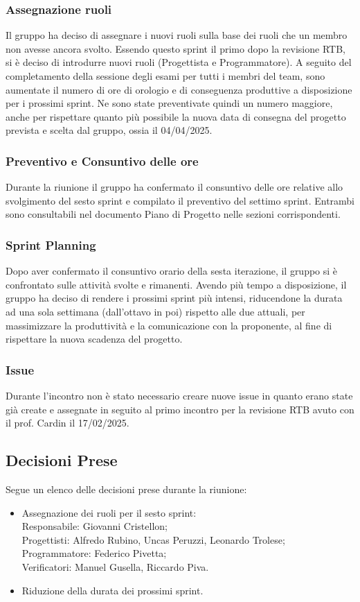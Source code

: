 \documentclass[10pt]{article}
\begin{document}
\subsubsection{Assegnazione ruoli}
Il gruppo ha deciso di assegnare i nuovi ruoli sulla base dei ruoli che un membro non avesse ancora svolto. Essendo questo sprint il primo dopo la revisione RTB, si è deciso di introdurre nuovi ruoli (Progettista e Programmatore). A seguito del completamento della sessione degli esami per tutti i membri del team, sono aumentate il numero di ore di orologio e di conseguenza produttive a disposizione per i prossimi sprint. Ne sono state preventivate quindi un numero maggiore, anche per rispettare quanto più possibile la nuova data di consegna del progetto prevista e scelta dal gruppo, ossia il 04/04/2025.

\subsubsection{Preventivo e Consuntivo delle ore}
Durante la riunione il gruppo ha confermato il consuntivo delle ore relative allo svolgimento del sesto sprint e compilato il preventivo del settimo sprint.
Entrambi sono consultabili nel documento Piano di Progetto nelle sezioni corrispondenti.

\subsubsection{Sprint Planning}
Dopo aver confermato il consuntivo orario della sesta iterazione, il gruppo si è confrontato sulle attività svolte e rimanenti. Avendo più tempo a disposizione, il gruppo ha deciso di rendere i prossimi sprint più intensi, riducendone la durata ad una sola settimana (dall'ottavo in poi) rispetto alle due attuali, per massimizzare la produttività e la comunicazione con la proponente, al fine di rispettare la nuova scadenza del progetto.

\subsubsection{Issue}
Durante l'incontro non è stato necessario creare nuove issue in quanto erano state già create e assegnate in seguito al primo incontro per la revisione RTB avuto con il prof. Cardin il 17/02/2025.

\subsection{Decisioni Prese}
Segue un elenco delle decisioni prese durante la riunione:
\begin{itemize}
    \item   Assegnazione dei ruoli per il sesto sprint:\\
            Responsabile: Giovanni Cristellon;\\
            Progettisti: Alfredo Rubino, Uncas Peruzzi, Leonardo Trolese;\\
            Programmatore: Federico Pivetta;\\
            Verificatori: Manuel Gusella, Riccardo Piva.
    \item   Riduzione della durata dei prossimi sprint.
\end{itemize}
\end{document}
